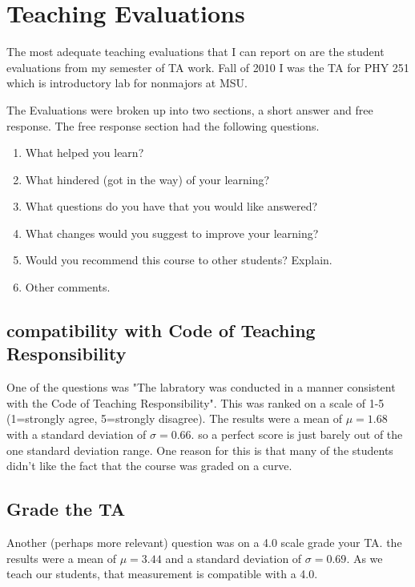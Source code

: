 \documentclass{article}
\begin{document}
\newpage
\section{Teaching Evaluations}
\hspace{0.5cm}The most adequate teaching evaluations that I can report on are the student evaluations from my semester of TA work. Fall of 2010 I was the TA for PHY 251 which is introductory lab for nonmajors at MSU. 

The Evaluations were broken up into two sections, a short answer and free response. The free response section had the following questions. 

\begin{enumerate}
\item What helped you learn?
\item What hindered (got in the way) of your learning? 
\item What questions do you have that you would like answered?
\item What changes would you suggest to improve your learning?
\item Would you recommend this course to other students? Explain.
\item Other comments.
\end{enumerate}

\subsection{compatibility with Code of Teaching Responsibility}
\hspace{0.5cm}One of the questions was "The labratory was conducted in a manner consistent with the Code of Teaching Responsibility". This was ranked on a scale of 1-5 (1=strongly agree, 5=strongly disagree). The results were a mean of $\mu=1.68$ with a standard deviation of $\sigma=0.66$. so a perfect score is just barely out of the one standard deviation range. One reason for this is that many of the students didn't like the fact that the course was graded on a curve. 

\subsection{Grade the TA}
\hspace{0.5cm}Another (perhaps more relevant) question was on a 4.0 scale grade your TA. the results were a mean of $\mu=3.44$ and a standard deviation of $\sigma=0.69$. As we teach our students, that measurement is compatible with a 4.0. 
\end{document}
